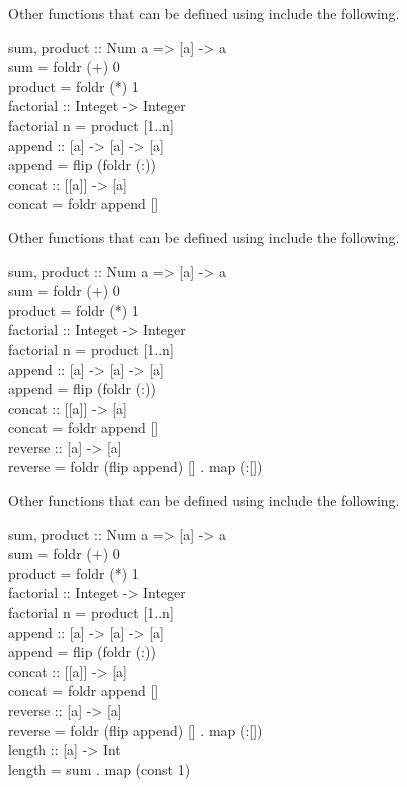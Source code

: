 \documentclass{seminar}
\begin{document}
\begin{slide}
\newslide

Other functions that can be defined using 
include the following.
\begin{code}
sum, product :: Num a => [a] -> a\\
sum = foldr (+) 0\\
product = foldr (*) 1\\
factorial :: Integet -> Integer\\
factorial n = product [1..n]\\
append :: [a] -> [a] -> [a]\\
append = flip (foldr (:))\\
concat :: [[a]] -> [a]\\
concat = foldr append []
\end{code}

\newslide

Other functions that can be defined using 
include the following.
\begin{code}
sum, product :: Num a => [a] -> a\\
sum = foldr (+) 0\\
product = foldr (*) 1\\
factorial :: Integet -> Integer\\
factorial n = product [1..n]\\
append :: [a] -> [a] -> [a]\\
append = flip (foldr (:))\\
concat :: [[a]] -> [a]\\
concat = foldr append []\\
reverse :: [a] -> [a]\\
reverse = foldr (flip append) [] . map (:[])
\end{code}

\newslide

Other functions that can be defined using 
include the following.
\begin{code}
sum, product :: Num a => [a] -> a\\
sum = foldr (+) 0\\
product = foldr (*) 1\\
factorial :: Integet -> Integer\\
factorial n = product [1..n]\\
append :: [a] -> [a] -> [a]\\
append = flip (foldr (:))\\
concat :: [[a]] -> [a]\\
concat = foldr append []\\
reverse :: [a] -> [a]\\
reverse = foldr (flip append) [] . map (:[])\\
length :: [a] -> Int\\
length = sum . map (const 1)
\end{code}


\end{slide}
\end{document}
